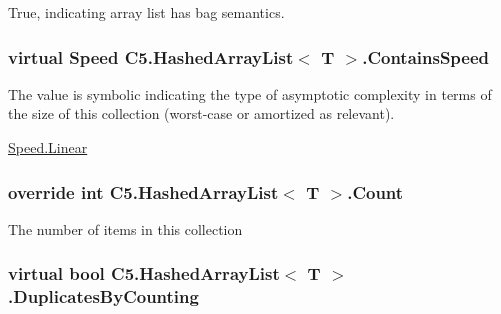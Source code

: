 True, indicating array list has bag semantics.\hypertarget{class_c5_1_1_hashed_array_list_adabe67b56cee8665745ded62f5bb5528}{}
\subsubsection[{Contains\+Speed}]{\setlength{\rightskip}{0pt plus 5cm}virtual {\bf Speed} {\bf C5.\+Hashed\+Array\+List}$<$ T $>$.Contains\+Speed\hspace{0.3cm}{\ttfamily [get]}}\label{class_c5_1_1_hashed_array_list_adabe67b56cee8665745ded62f5bb5528}


The value is symbolic indicating the type of asymptotic complexity in terms of the size of this collection (worst-\/case or amortized as relevant). 

\hyperlink{namespace_c5_a615ba88dcdaa8d5a3c5f833a73d7fad6a32a843da6ea40ab3b17a3421ccdf671b}{Speed.\+Linear}\hypertarget{class_c5_1_1_hashed_array_list_a46e32f347ac0e80756fdc98970424e8b}{}
\subsubsection[{Count}]{\setlength{\rightskip}{0pt plus 5cm}override int {\bf C5.\+Hashed\+Array\+List}$<$ T $>$.Count\hspace{0.3cm}{\ttfamily [get]}}\label{class_c5_1_1_hashed_array_list_a46e32f347ac0e80756fdc98970424e8b}




The number of items in this collection\hypertarget{class_c5_1_1_hashed_array_list_a12f8301ee0eb89f4f25508a6e22e0105}{}
\subsubsection[{Duplicates\+By\+Counting}]{\setlength{\rightskip}{0pt plus 5cm}virtual bool {\bf C5.\+Hashed\+Array\+List}$<$ T $>$.Duplicates\+By\+Counting\hspace{0.3cm}{\ttfamily [get]}}\label{class_c5_1_1_hashed_array_list_a12f8301ee0eb89f4f25508a6e22e0105}


